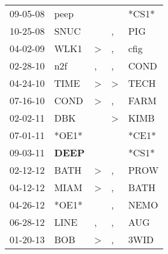 \begin{supertabular}{p{0.07\textwidth}p{0.06\textwidth}p{0.02\textwidth}p{0.02\textwidth}p{0.06\textwidth}}
          09-05-08\textsuperscript{} &           peep\textsuperscript{} &                  &                  &                            *CS1* \\
          10-25-08\textsuperscript{} &           SNUC\textsuperscript{} &                  &                , &            PIG\textsuperscript{} \\
          04-02-09\textsuperscript{} &           WLK1\textsuperscript{} &     \textgreater &                , &           cfig\textsuperscript{} \\
          02-28-10\textsuperscript{} &            n2f\textsuperscript{} &                , &                , &           COND\textsuperscript{} \\
          04-24-10\textsuperscript{} &           TIME\textsuperscript{} &     \textgreater &     \textgreater &           TECH\textsuperscript{} \\
          07-16-10\textsuperscript{} &           COND\textsuperscript{} &     \textgreater &                , &           FARM\textsuperscript{} \\
          02-02-11\textsuperscript{} &            DBK\textsuperscript{} &                  &     \textgreater &           KIMB\textsuperscript{} \\
          07-01-11\textsuperscript{} &                            *OE1* &                  &                  &                            *CE1* \\
          09-03-11\textsuperscript{} &  \textbf{DEEP\textsuperscript{}} &                  &                  &                            *CS1* \\
          02-12-12\textsuperscript{} &           BATH\textsuperscript{} &     \textgreater &                , &           PROW\textsuperscript{} \\
          04-12-12\textsuperscript{} &           MIAM\textsuperscript{} &     \textgreater &                , &           BATH\textsuperscript{} \\
          04-26-12\textsuperscript{} &                            *OE1* &                  &                , &           NEMO\textsuperscript{} \\
          06-28-12\textsuperscript{} &           LINE\textsuperscript{} &                , &                , &            AUG\textsuperscript{} \\
          01-20-13\textsuperscript{} &            BOB\textsuperscript{} &     \textgreater &                , &           3WID\textsuperscript{} \\

\end{supertabular}

